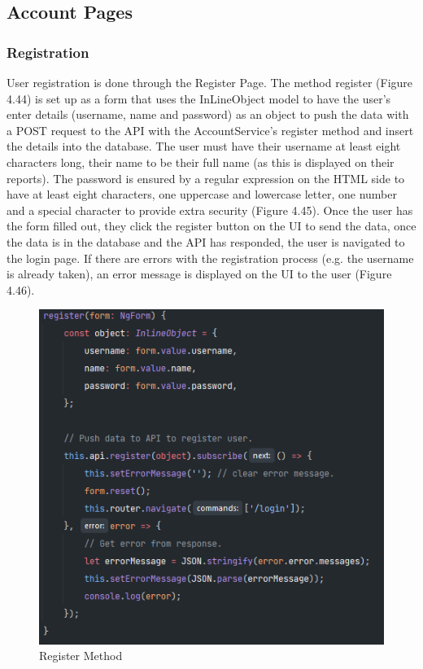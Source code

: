\subsection{Account Pages}

\subsubsection{Registration}
User registration is done through the Register Page. The method register (Figure 4.44) is set up as a form that uses the InLineObject model to have the user's enter details (username, name and password) as an object to push the data with a POST request to the API with the AccountService's register method and insert the details into the database. The user must have their username at least eight characters long, their name to be their full name (as this is displayed on their reports). The password is ensured by a regular expression on the HTML side to have at least eight characters, one uppercase and lowercase letter, one number and a special character to provide extra security (Figure 4.45). Once the user has the form filled out, they click the register button on the UI to send the data, once the data is in the database and the API has responded, the user is navigated to the login page. If there are errors with the registration process (e.g. the username is already taken), an error message is displayed on the UI to the user (Figure 4.46).

\begin{figure}[H]
    \caption{Register Method}
    \label{image:registerMethod}
    \centering
    \includegraphics[width=1.0\textwidth]{images/repota/account_pages/register.png}
\end{figure}

